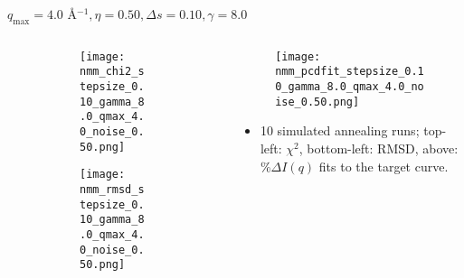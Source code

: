 \documentclass{beamer}
\begin{document}
\begin{frame}{$ q_{\textrm{max}}=4.0 $ \AA $^{-1}, \eta=0.50, \Delta s=0.10, \gamma=8.0$}
	\begin{columns}
		\begin{column}{.5\textwidth}
			\begin{figure}[H]
			\centering
			\begin{subfigure}[b]{\textwidth}
				\centering
				\texttt{[image: nmm\_chi2\_stepsize\_0.10\_gamma\_8.0\_qmax\_4.0\_noise\_0.50.png]}
				\label{fig:}
			\end{subfigure}
			\begin{subfigure}[b]{\textwidth}
				\centering
				\texttt{[image: nmm\_rmsd\_stepsize\_0.10\_gamma\_8.0\_qmax\_4.0\_noise\_0.50.png]}
				\label{fig:}
			\end{subfigure}
			\end{figure}
		\end{column}
		\begin{column}{.5\textwidth}
			\begin{figure}[H]
				\centering
				\texttt{[image: nmm\_pcdfit\_stepsize\_0.10\_gamma\_8.0\_qmax\_4.0\_noise\_0.50.png]}
				\label{fig:}
			\end{figure}
			\begin{itemize}
				\item 10 simulated annealing runs; top-left: $\chi^2$, bottom-left: RMSD, above: $\%\Delta I(q)$ fits to the target curve.
			\end{itemize}
		\end{column}
	\end{columns}
\end{frame}
 
\end{document}
